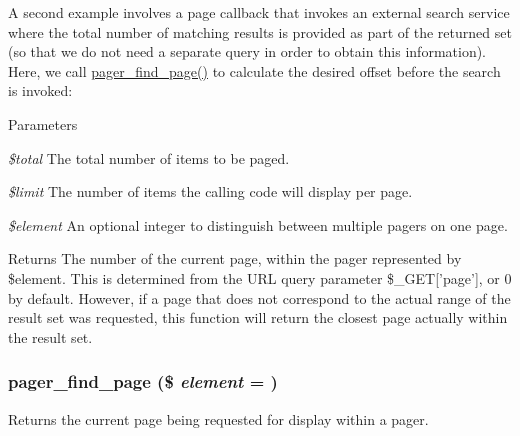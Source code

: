 A second example involves a page callback that invokes an external search service where the total number of matching results is provided as part of the returned set (so that we do not need a separate query in order to obtain this information). Here, we call \hyperlink{pager_8inc_a7c4b7f1b30cc884b4823937ac86c71d5}{pager\_\-find\_\-page()} to calculate the desired offset before the search is invoked: 



\begin{DoxyParams}{Parameters}
\item[{\em \$total}]The total number of items to be paged. \item[{\em \$limit}]The number of items the calling code will display per page. \item[{\em \$element}]An optional integer to distinguish between multiple pagers on one page.\end{DoxyParams}
\begin{DoxyReturn}{Returns}
The number of the current page, within the pager represented by \$element. This is determined from the URL query parameter \$\_\-GET\mbox{[}'page'\mbox{]}, or 0 by default. However, if a page that does not correspond to the actual range of the result set was requested, this function will return the closest page actually within the result set. 
\end{DoxyReturn}
\hypertarget{pager_8inc_a7c4b7f1b30cc884b4823937ac86c71d5}{
\subsubsection[{pager\_\-find\_\-page}]{\setlength{\rightskip}{0pt plus 5cm}pager\_\-find\_\-page (\$ {\em element} = {})}}
\label{pager_8inc_a7c4b7f1b30cc884b4823937ac86c71d5}
Returns the current page being requested for display within a pager.


